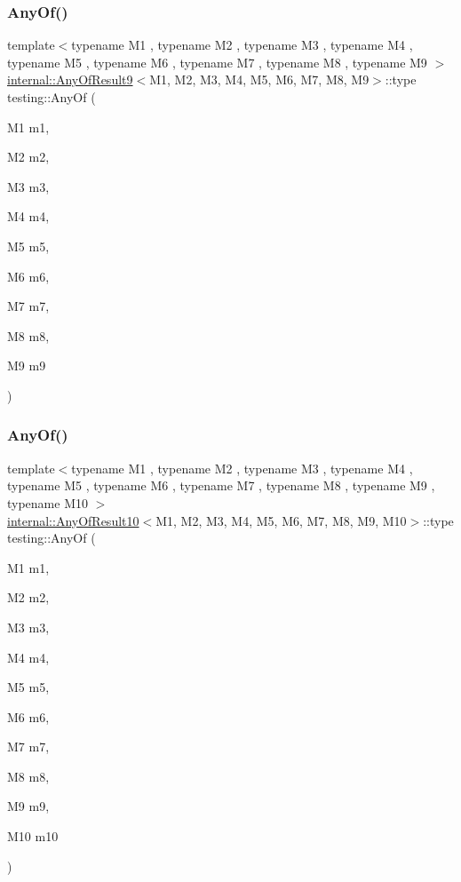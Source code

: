 \mbox{\label{namespacetesting_a873c812db953aebd4bf2ffbff0e8d770}} 
\subsubsection{\texorpdfstring{AnyOf()}{AnyOf()}\hspace{0.1cm}{\footnotesize\ttfamily [8/9]}}
{\footnotesize\ttfamily template$<$typename M1 , typename M2 , typename M3 , typename M4 , typename M5 , typename M6 , typename M7 , typename M8 , typename M9 $>$ \\
\mbox{\hyperlink{structtesting_1_1internal_1_1_any_of_result9}{internal\+::\+Any\+Of\+Result9}}$<$M1, M2, M3, M4, M5, M6, M7, M8, M9$>$\+::type testing\+::\+Any\+Of (\begin{DoxyParamCaption}\item[{M1}]{m1,  }\item[{M2}]{m2,  }\item[{M3}]{m3,  }\item[{M4}]{m4,  }\item[{M5}]{m5,  }\item[{M6}]{m6,  }\item[{M7}]{m7,  }\item[{M8}]{m8,  }\item[{M9}]{m9 }\end{DoxyParamCaption})\hspace{0.3cm}{\ttfamily [inline]}}

\mbox{\label{namespacetesting_a1797921d3ed04c7f13dfa8f36bf0bf1c}} 
\subsubsection{\texorpdfstring{AnyOf()}{AnyOf()}\hspace{0.1cm}{\footnotesize\ttfamily [9/9]}}
{\footnotesize\ttfamily template$<$typename M1 , typename M2 , typename M3 , typename M4 , typename M5 , typename M6 , typename M7 , typename M8 , typename M9 , typename M10 $>$ \\
\mbox{\hyperlink{structtesting_1_1internal_1_1_any_of_result10}{internal\+::\+Any\+Of\+Result10}}$<$M1, M2, M3, M4, M5, M6, M7, M8, M9, M10$>$\+::type testing\+::\+Any\+Of (\begin{DoxyParamCaption}\item[{M1}]{m1,  }\item[{M2}]{m2,  }\item[{M3}]{m3,  }\item[{M4}]{m4,  }\item[{M5}]{m5,  }\item[{M6}]{m6,  }\item[{M7}]{m7,  }\item[{M8}]{m8,  }\item[{M9}]{m9,  }\item[{M10}]{m10 }\end{DoxyParamCaption})\hspace{0.3cm}{\ttfamily [inline]}}

